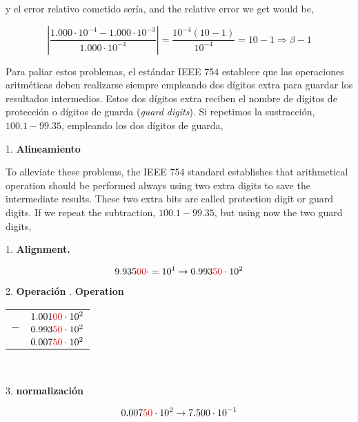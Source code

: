 \begin{paracol}{2}
y el error relativo cometido sería,
\switchcolumn
and the relative error we get would be,
\end{paracol}

\begin{equation*}
\left\vert\frac{1.000\cdot10^{-4}-1.000\cdot10^{-3}}{1.000\cdot10^{-4}}\right\vert=\frac{10^{-4}(10-1)}{10^{-4}}=10-1\Rightarrow\beta -1
\end{equation*}

\begin{paracol}{2}
Para paliar estos problemas, el estándar IEEE 754 establece que las operaciones aritméticas deben realizarse siempre empleando dos dígitos extra para guardar los resultados intermedios. Estos dos dígitos extra reciben el nombre de dígitos de protección o dígitos de guarda (\emph{guard digits}).
Si repetimos la sustracción, $100.1-99.35$, empleando los dos dígitos de guarda,

1. \textbf{Alineamiento}

\switchcolumn
To alleviate these problems, the IEEE 754 standard establishes that arithmetical operation should be performed always using two extra digits to save the intermediate results. These two extra bits are called protection digit or guard digits.
If we repeat the subtraction, $100.1-99.35$, but using now the two guard digits,

1. \textbf{Alignment.}  

\end{paracol}
\begin{equation*}
9.935{\color{red}00}\cdot=10^1\rightarrow 0.993{\color{red}50} \cdot 10^2
\end{equation*}

\begin{paracol}{2}
2. \textbf{Operación}
. \textbf{Operation}
\end{paracol}
\begin{minipage}{\textwidth}
\centering
\begin{tabular}{c r}
&$1.001{\color{red}00} \cdot10^2$\\
$-$&$0.993{\color{red}50}\cdot10^2$\\
\hline
&$0.007{\color{red}50}\cdot10^2$
\end{tabular}\\
\end{minipage}

\begin{paracol}{2}
3. \textbf{normalización}
\end{paracol}
\begin{equation*}
0.007{\color{red}50}\cdot10^2\rightarrow 7.500\cdot10^{-1}
\end{equation*}

